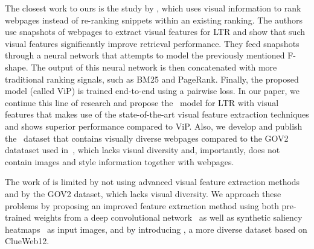 The closest work to ours is the study by \citet{fan2017learning}, which uses visual information to rank webpages instead of re-ranking snippets within an existing ranking.
The authors use snapshots of webpages to extract visual features for LTR
and show that such visual features significantly improve retrieval performance.
They feed snapshots through a neural network that attempts to model the previously mentioned F-shape.
The output of this neural network is then concatenated with more traditional ranking signals, such as BM25 and PageRank.
Finally, the proposed model (called ViP) is trained end-to-end using a pairwise loss.
In our paper, we continue this line of research and propose the \modelname~model for \ac{LTR} with visual features
that makes use of the state-of-the-art visual feature extraction techniques and shows superior performance compared to ViP.
Also, we develop and publish the \datasetname~dataset that contains visually diverse webpages
compared to the GOV2 datataset used in~\cite{fan2017learning}, which lacks visual diversity and, importantly, does not contain images and style information together with webpages.

The work of \citet{fan2017learning} is limited by not using advanced visual feature extraction methods and by the GOV2 dataset, which lacks visual diversity.
We approach these problems by proposing an improved feature extraction method using both pre-trained weights from a deep convolutional network~\cite{simonyan2014very} as well as synthetic saliency heatmaps~\cite{shan2017two} as input images, and by introducing \datasetname, a more diverse dataset based on ClueWeb12.
\fi






